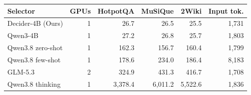 \begin{tabular}{@{}lrrrrr@{}}
\toprule
Selector & GPUs & HotpotQA & MuSiQue & 2Wiki & Input tok.\\
\midrule
Decider-4B (Ours) & 1 & 26.7 & 26.5 & 25.5 & 1,731 \\
Qwen3-4B & 1 & 27.2 & 26.8 & 25.7 & 1,803 \\
Qwen3.8 zero-shot & 1 & 162.3 & 156.7 & 160.4 & 1,799 \\
Qwen3.8 few-shot & 1 & 178.6 & 234.0 & 186.4 & 8,183 \\
GLM-5.3 & 2 & 324.9 & 431.3 & 416.7 & 1,708 \\
Qwen3.8 thinking & 1 & 3,378.4 & 6,011.2 & 5,522.6 & 1,836 \\
\bottomrule
\end{tabular}
